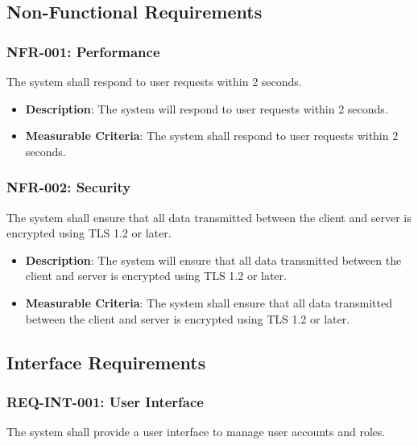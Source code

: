 \documentclass{article}
\begin{document}
\subsection{Non-Functional Requirements}

\subsubsection{NFR-001: Performance}
The system shall respond to user requests within 2 seconds.

\begin{itemize}
\item \textbf{Description}: The system will respond to user requests within 2 seconds.
\item \textbf{Measurable Criteria}: The system shall respond to user requests within 2 seconds.
\end{itemize}

\subsubsection{NFR-002: Security}
The system shall ensure that all data transmitted between the client and server is encrypted using TLS 1.2 or later.

\begin{itemize}
\item \textbf{Description}: The system will ensure that all data transmitted between the client and server is encrypted using TLS 1.2 or later.
\item \textbf{Measurable Criteria}: The system shall ensure that all data transmitted between the client and server is encrypted using TLS 1.2 or later.
\end{itemize}

\subsection{Interface Requirements}

\subsubsection{REQ-INT-001: User Interface}
The system shall provide a user interface to manage user accounts and roles.
\end{document}
